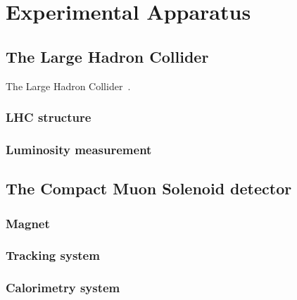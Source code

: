 \chapter{Experimental Apparatus}
\label{chap:ExperimentalApparatus}


\section{The Large Hadron Collider}
\label{sec:LHC}


The Large Hadron Collider~\cite{Evans:2008zzb}.


\subsection{LHC structure}


\subsection{Luminosity measurement}
\label{sec:LuminosityMeasurement}


\section{The Compact Muon Solenoid detector}
\label{sec:CMS}


\subsection{Magnet}
\label{sec:Magnet}


\subsection{Tracking system}
\label{sec:TrackingSystem}


\subsection{Calorimetry system}
\label{sec:Calorimetry}


